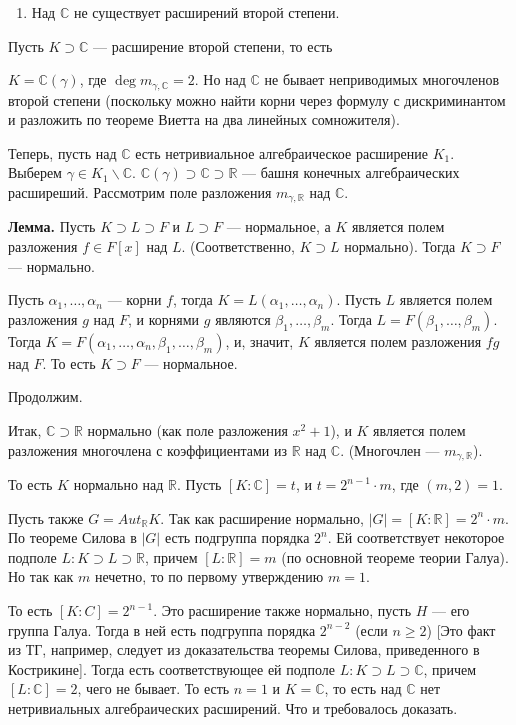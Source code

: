 \begin{enumerate}
\def\labelenumi{\arabic{enumi})}
\setcounter{enumi}{1}
\tightlist
\item
  Над \(\mathbb{C}\) не существует расширений второй степени.
\end{enumerate}

Пусть \(K \supset \mathbb{C}\) --- расширение второй степени, то есть

\(K = \mathbb{C}(\gamma)\), где \(\deg m_{\gamma, \mathbb{C}} = 2\). Но над \(\mathbb{C}\) не бывает неприводимых многочленов второй степени (поскольку можно найти корни через формулу с дискриминантом и разложить по теореме Виетта на два линейных сомножителя).

Теперь, пусть над \(\mathbb{C}\) есть нетривиальное алгебраическое расширение \(K_1\). Выберем \(\gamma \in K_1 \backslash \mathbb{C}\). \(\mathbb{C}(\gamma) \supset \mathbb{C} \supset \mathbb{R}\) --- башня конечных алгебраических расширеший. Рассмотрим поле разложения \(m_{\gamma, \mathbb{R}}\) над \(\mathbb{C}\).

\textbf{Лемма.} Пусть \(K \supset L \supset F\) и \(L \supset F\) --- нормальное, а \(K\) является полем разложения \(f \in F[x]\) над \(L\). (Соответственно, \(K \supset L\) нормально). Тогда \(K \supset F\) --- нормально.

Пусть \(\alpha_1, \ldots, \alpha_n\) --- корни \(f\), тогда \(K = L(\alpha_1, \ldots, \alpha_n)\). Пусть \(L\) является полем разложения \(g\) над \(F\), и корнями \(g\) являются \(\beta_1, \ldots, \beta_m\). Тогда \(L = F(\beta_1, \ldots, \beta_m)\). Тогда \(K = F(\alpha_1, \ldots, \alpha_n, \beta_1, \ldots, \beta_m)\), и, значит, \(K\) является полем разложения \(fg\) над \(F\). То есть \(K \supset F\) --- нормальное.

Продолжим.

Итак, \(\mathbb{C} \supset \mathbb{R}\) нормально (как поле разложения \(x^2 + 1\)), и \(K\) является полем разложения многочлена с коэффициентами из \(\mathbb{R}\) над \(\mathbb{C}\). (Многочлен --- \(m_{\gamma, \mathbb{R}}\)).

То есть \(K\) нормально над \(\mathbb{R}\). Пусть \([K : \mathbb{C}] = t\), и \(t = 2^{n - 1} \cdot m\), где \((m, 2) = 1\).

Пусть также \(G = Aut_{\mathbb{R}}K\). Так как расширение нормально, \(|G| = [K : \mathbb{R}] = 2^n \cdot m\). По теореме Силова в \(|G|\) есть подгруппа порядка \(2^n\). Ей соответствует некоторое подполе \(L: K \supset L \supset \mathbb{R}\), причем \([L : \mathbb{R}] = m\) (по основной теореме теории Галуа). Но так как \(m\) нечетно, то по первому утверждению \(m = 1\).

То есть \([K : C] = 2^{n - 1}\). Это расширение также нормально, пусть \(H\) --- его группа Галуа. Тогда в ней есть подгруппа порядка \(2^{n - 2}\) (если \(n \geqslant 2\)) {[}Это факт из ТГ, например, следует из доказательства теоремы Силова, приведенного в Кострикине{]}. Тогда есть соответствующее ей подполе \(L: K \supset L \supset \mathbb{C}\), причем \([L : \mathbb{C}] = 2\), чего не бывает. То есть \(n = 1\) и \(K = \mathbb{C}\), то есть над \(\mathbb{C}\) нет нетривиальных алгебраических расширений. Что и требовалось доказать.


